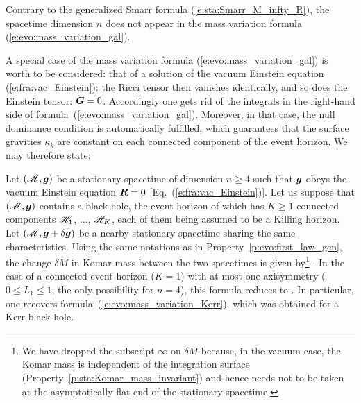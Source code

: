 \begin{remark}
Contrary to the generalized Smarr formula (\ref{e:sta:Smarr_M_infty_R}), the spacetime dimension $n$ does not appear in the mass variation
formula (\ref{e:evo:mass_variation_gal}).
\end{remark}

A special case of the mass variation formula (\ref{e:evo:mass_variation_gal}) is worth to be considered: that of a solution of the vacuum Einstein equation (\ref{e:fra:vac_Einstein}):
the Ricci tensor then vanishes identically, and so does the Einstein tensor: $\bm{G} = 0$.
Accordingly one gets rid of the integrals in the
right-hand side of formula~(\ref{e:evo:mass_variation_gal}). Moreover, in that case,
the null dominance condition is automatically fulfilled, which guarantees that the surface gravities
$\kappa_k$ are constant on each connected component of the event horizon. We may therefore state:

\begin{prop}
\label{p:evo:first_vac_GR}
Let $(\mathscr{M},\bm{g})$ be a stationary spacetime of dimension $n\geq 4$ such that $\bm{g}$ obeys
the vacuum Einstein equation $\bm{R} = 0$ [Eq.~(\ref{e:fra:vac_Einstein})]. Let us
suppose that $(\mathscr{M},\bm{g})$ contains a black
hole, the event horizon of which has $K \geq 1$ connected components
$\mathscr{H}_{1}$, $\ldots$, $\mathscr{H}_{K}$, each of them being assumed to be a Killing horizon.
Let $(\mathscr{M},\bm{g}+\delta\bm{g})$ be a nearby stationary spacetime sharing the same characteristics.
Using the same notations as in Property~\ref{p:evo:first_law_gen}, the
change $\delta M$ in Komar mass between the two spacetimes
is given by\footnote{We have dropped the subscript $\infty$ on $\delta M$ because, in
the vacuum case, the Komar mass is independent of the integration surface
(Property~\ref{p:sta:Komar_mass_invariant}) and hence needs not to be taken at the asymptotically flat
end of the stationary spacetime.}
\be \label{e:evo:mass_variation_vacuum}
    .
\ee
In the case of a connected event horizon ($K=1$)
with at most one axisymmetry ($0 \leq L_1 \leq 1$, the only possibility for $n=4$),
this formula reduces to
\be \label{e:evo:mass_variation_vacuum_n4}
    .
\ee
In particular, one recovers formula~(\ref{e:evo:mass_variation_Kerr}), which was obtained
for a Kerr black hole.
\end{prop}


